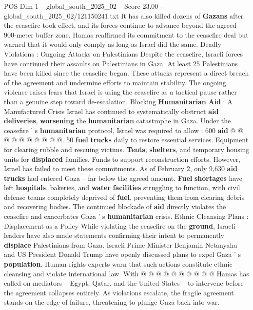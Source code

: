 \begin{textsample}{POS Dim 1 – global\_south\_2025\_02 – Score 23.00 – global\_south\_2025\_02/121150241.txt}
It has also killed dozens of \textbf{Gazans} after the ceasefire took effect, and its forces continue to advance beyond the agreed 900-meter buffer zone.
Hamas reaffirmed its commitment to the ceasefire deal but warned that it would only comply as long as Israel did the same.
Deadly Violations : Ongoing Attacks on Palestinians Despite the ceasefire, Israeli forces have continued their assaults on Palestinians in Gaza.
At least 25 Palestinians have been killed since the ceasefire began.
These attacks represent a direct breach of the agreement and undermine efforts to maintain stability.
The ongoing violence raises fears that Israel is using the ceasefire as a tactical pause rather than a genuine step toward de-escalation.
Blocking \textbf{Humanitarian} \textbf{Aid} : A Manufactured Crisis Israel has continued to systematically obstruct \textbf{aid} \textbf{deliveries}, \textbf{worsening} the \textbf{humanitarian} catastrophe in Gaza.
Under the ceasefire ' s \textbf{humanitarian} protocol, Israel was required to allow : 600 \textbf{aid} @ @ @ @ @ @ @ @ @ @. 50 \textbf{fuel} \textbf{trucks} daily to restore essential services.
Equipment for clearing rubble and rescuing victims. \textbf{Tents}, \textbf{shelters}, and temporary housing units for \textbf{displaced} families.
Funds to support reconstruction efforts.
However, Israel has failed to meet these commitments.
As of February 2, only 9,630 \textbf{aid} \textbf{trucks} had entered Gaza -- far below the agreed amount. \textbf{Fuel} \textbf{shortages} have left \textbf{hospitals}, bakeries, and \textbf{water} \textbf{facilities} struggling to function, with civil defense teams completely deprived of \textbf{fuel}, preventing them from clearing debris and recovering bodies.
The continued blockade of \textbf{aid} directly violates the ceasefire and exacerbates Gaza ' s \textbf{humanitarian} crisis.
Ethnic Cleansing Plans : Displacement as a Policy While violating the ceasefire on the \textbf{ground}, Israeli leaders have also made statements confirming their intent to permanently \textbf{displace} Palestinians from Gaza.
Israeli Prime Minister Benjamin Netanyahu and US President Donald Trump have openly discussed plans to expel Gaza ' s \textbf{population}.
Human rights experts warn that such actions constitute ethnic cleansing and violate international law.
With @ @ @ @ @ @ @ @ @ @ Hamas has called on mediators -- Egypt, Qatar, and the United States -- to intervene before the agreement collapses entirely.
As violations escalate, the fragile agreement stands on the edge of failure, threatening to plunge Gaza back into war.

\end{textsample}

